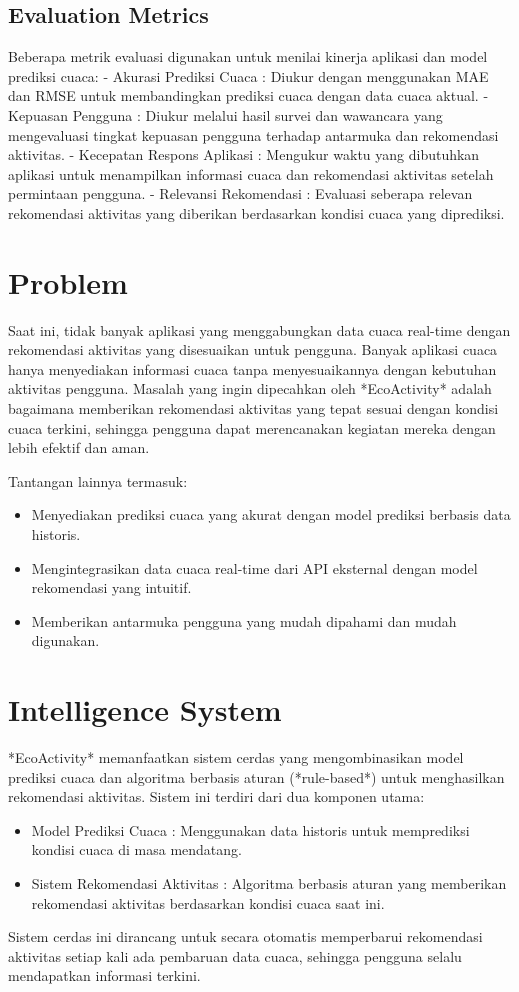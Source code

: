 \documentclass[journal,article,submit,pdftex,moreauthors]{Definitions/mdpi}
\begin{document}
\subsection{Evaluation Metrics}
Beberapa metrik evaluasi digunakan untuk menilai kinerja aplikasi dan model prediksi cuaca:
- Akurasi Prediksi Cuaca : Diukur dengan menggunakan MAE dan RMSE untuk membandingkan prediksi cuaca dengan data cuaca aktual.
- Kepuasan Pengguna : Diukur melalui hasil survei dan wawancara yang mengevaluasi tingkat kepuasan pengguna terhadap antarmuka dan rekomendasi aktivitas.
- Kecepatan Respons Aplikasi : Mengukur waktu yang dibutuhkan aplikasi untuk menampilkan informasi cuaca dan rekomendasi aktivitas setelah permintaan pengguna.
- Relevansi Rekomendasi : Evaluasi seberapa relevan rekomendasi aktivitas yang diberikan berdasarkan kondisi cuaca yang diprediksi.

\section{Problem}

Saat ini, tidak banyak aplikasi yang menggabungkan data cuaca real-time dengan rekomendasi aktivitas yang disesuaikan untuk pengguna. Banyak aplikasi cuaca hanya menyediakan informasi cuaca tanpa menyesuaikannya dengan kebutuhan aktivitas pengguna. Masalah yang ingin dipecahkan oleh *EcoActivity* adalah bagaimana memberikan rekomendasi aktivitas yang tepat sesuai dengan kondisi cuaca terkini, sehingga pengguna dapat merencanakan kegiatan mereka dengan lebih efektif dan aman. 

Tantangan lainnya termasuk:
\begin{itemize}
    \item Menyediakan prediksi cuaca yang akurat dengan model prediksi berbasis data historis.
    \item Mengintegrasikan data cuaca real-time dari API eksternal dengan model rekomendasi yang intuitif.
    \item Memberikan antarmuka pengguna yang mudah dipahami dan mudah digunakan.
\end{itemize}

\section{Intelligence System}

*EcoActivity* memanfaatkan sistem cerdas yang mengombinasikan model prediksi cuaca dan algoritma berbasis aturan (*rule-based*) untuk menghasilkan rekomendasi aktivitas. Sistem ini terdiri dari dua komponen utama:
\begin{itemize}
    \item Model Prediksi Cuaca : Menggunakan data historis untuk memprediksi kondisi cuaca di masa mendatang.
    \item Sistem Rekomendasi Aktivitas : Algoritma berbasis aturan yang memberikan rekomendasi aktivitas berdasarkan kondisi cuaca saat ini.
\end{itemize}
Sistem cerdas ini dirancang untuk secara otomatis memperbarui rekomendasi aktivitas setiap kali ada pembaruan data cuaca, sehingga pengguna selalu mendapatkan informasi terkini.
\end{document}
